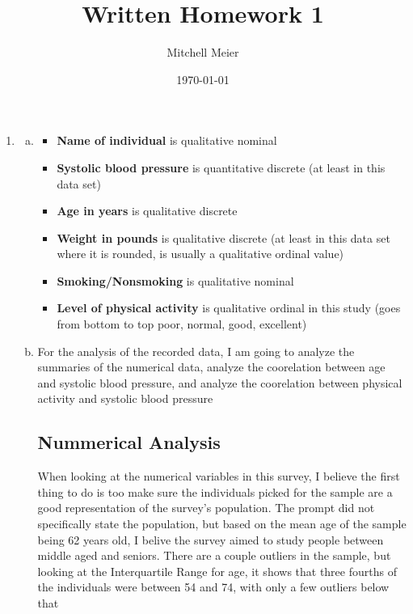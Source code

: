 \documentclass[14pt]{article}
\title{Written Homework 1}
\author{Mitchell Meier}
\date{\today}
\newcommand{\bd}{\textbf}
\begin{document}
\maketitle

\begin{enumerate}

\item

\begin{enumerate}[(a)]

\item
\begin{itemize}
\item \bd{Name of individual} is qualitative nominal 
\item \bd{Systolic blood pressure} is quantitative discrete (at least in this data set) 
\item \bd{Age in years} is qualitative discrete 
\item \bd{Weight in pounds} is qualitative discrete (at least in this data set where it is rounded, is usually a qualitative ordinal value) 
\item \bd{Smoking/Nonsmoking} is qualitative nominal 
\item \bd{Level of physical activity} is qualitative ordinal in this study (goes from bottom to top poor, normal, good, excellent) 
\end{itemize}

\item
For the analysis of the recorded data, I am going to analyze the summaries of the numerical data, analyze the coorelation between age and systolic blood pressure, and analyze the coorelation between physical activity and systolic blood pressure 

\subsection*{Nummerical Analysis}

When looking at the numerical variables in this survey, I believe the first thing to do is too make sure the individuals picked for the sample are a good representation of the survey's population. The prompt did not specifically state the population, but based on the mean age of the sample being 62 years old, I belive the survey aimed to study people between middle aged and seniors. There are a couple outliers in the sample, but looking at the Interquartile Range for age, it shows that three fourths of the individuals were between 54 and 74, with only a few outliers below that \pagebreak


\end{enumerate}
\end{enumerate}
\end{document}

